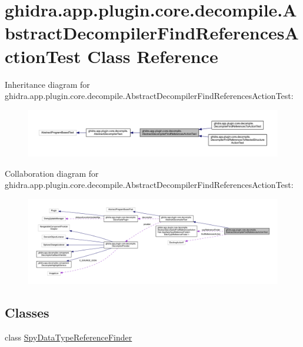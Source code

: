 \hypertarget{classghidra_1_1app_1_1plugin_1_1core_1_1decompile_1_1_abstract_decompiler_find_references_action_test}{}\section{ghidra.\+app.\+plugin.\+core.\+decompile.\+Abstract\+Decompiler\+Find\+References\+Action\+Test Class Reference}
\label{classghidra_1_1app_1_1plugin_1_1core_1_1decompile_1_1_abstract_decompiler_find_references_action_test}


Inheritance diagram for ghidra.\+app.\+plugin.\+core.\+decompile.\+Abstract\+Decompiler\+Find\+References\+Action\+Test\+:
\nopagebreak
\begin{figure}[H]
\begin{center}
\leavevmode
\includegraphics[width=350pt]{classghidra_1_1app_1_1plugin_1_1core_1_1decompile_1_1_abstract_decompiler_find_references_action_test__inherit__graph}
\end{center}
\end{figure}


Collaboration diagram for ghidra.\+app.\+plugin.\+core.\+decompile.\+Abstract\+Decompiler\+Find\+References\+Action\+Test\+:
\nopagebreak
\begin{figure}[H]
\begin{center}
\leavevmode
\includegraphics[width=350pt]{classghidra_1_1app_1_1plugin_1_1core_1_1decompile_1_1_abstract_decompiler_find_references_action_test__coll__graph}
\end{center}
\end{figure}
\subsection*{Classes}
\begin{DoxyCompactItemize}
\item 
class \mbox{\hyperlink{classghidra_1_1app_1_1plugin_1_1core_1_1decompile_1_1_abstract_decompiler_find_references_action62f1da74789936d35e783df474af1e76}{Spy\+Data\+Type\+Reference\+Finder}}
\end{DoxyCompactItemize}

